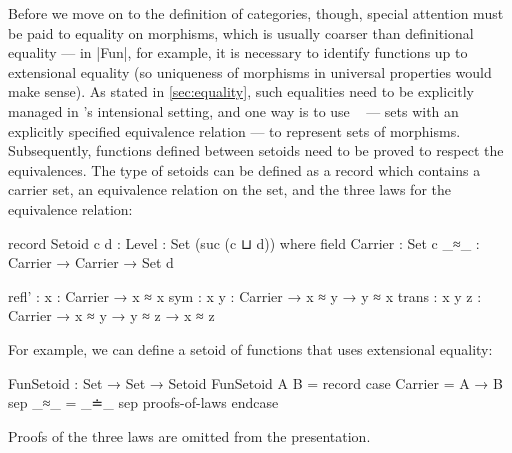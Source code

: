 Before we move on to the definition of categories, though, special attention must be paid to equality on morphisms, which is usually coarser than definitional equality --- in |Fun|, for example, it is necessary to identify functions up to extensional equality (so uniqueness of morphisms in universal properties would make sense).
As stated in \autoref{sec:equality}, such equalities need to be explicitly managed in \Agda's intensional setting, and one way is to use ~\citep{Barthe-setoids} --- sets with an explicitly specified equivalence relation --- to represent sets of morphisms.
Subsequently, functions defined between setoids need to be proved to respect the equivalences.
The type of setoids can be defined as a record which contains a carrier set, an equivalence relation on the set, and the three laws for the equivalence relation:
\begin{code}
record Setoid {c d : Level} : Set (suc (c ⊔ d)) where
  field
    Carrier  : Set c
    _≈_      : Carrier → Carrier → Set d

    refl'  : {x : Carrier} → x ≈ x
    sym    : {x y : Carrier} → x ≈ y → y ≈ x
    trans  : {x y z : Carrier} → x ≈ y → y ≈ z → x ≈ z
\end{code}
For example, we can define a setoid of functions that uses extensional equality:
\begin{code}
FunSetoid : Set → Set → Setoid
FunSetoid A B = record  case  Carrier  =  A → B
                        sep   _≈_      =  _≐_
                        sep   proofs-of-laws endcase
\end{code}
Proofs of the three laws are omitted from the presentation.

